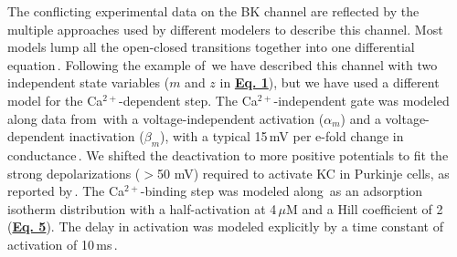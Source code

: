 \documentclass[12pt]{article}
\begin{document}
The conflicting experimental data on the BK channel are reflected by the multiple approaches used by different modelers to describe this channel. Most models lump all the open-closed transitions together into one differential equation\,\cite{hines84:_effic, Moczydlowski:1983qa, D:1982lh, Yamada-W:1989bs}. Following the example of\,\cite{Traub-R-D:1991mi} we have described this channel with two independent state variables ($m$ and $z$ in \href{pub-purkinje-deschutter-equations/pub-purkinje-deschutter-equations.tex}{\bf Eq. 1}), but we have used a different model for the Ca$^{2+}$-dependent step. The Ca$^{2+}$-independent gate was modeled along data from\,\cite{Gola:1990pi} with a voltage-independent activation ($\alpha_m$) and a voltage-dependent inactivation ($\beta_m$), with a typical 15\,mV per e-fold change in conductance\,\cite{Franciolini:1988fu, Latorre:1989fu}. We shifted the deactivation to more positive potentials to fit the strong depolarizations ($>$50 mV) required to activate KC in Purkinje cells, as reported by\,\cite{Gruol:1991dz}. The Ca$^{2+}$-binding step was modeled along\,\cite{Franciolini:1988fu} as an adsorption isotherm distribution with a half-activation at 4\,$\mu$M and a Hill coefficient of 2 (\href{pub-purkinje-deschutter-equations/pub-purkinje-deschutter-equations.tex}{\bf Eq. 5}). The delay in activation was modeled explicitly by a time constant of activation of 10\,ms\,\cite{Gola:1990pi, Ikemoto:1989lh, L:1989ff}.



\end{document}
